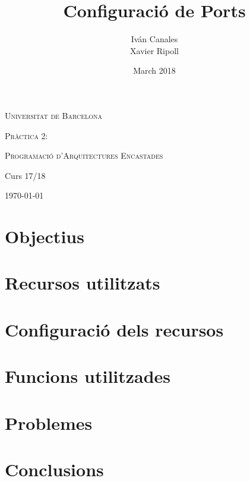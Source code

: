 \documentclass[12pt,a4paper]{article}
\title{Configuració de Ports}
\author{
    Iván Canales%
    \\ 
    Xavier Ripoll%
}
\date{March 2018}
\begin{document}

\begin{titlepage}
	\centering
	{\scshape\LARGE Universitat de Barcelona \par}
	\vspace{2cm}
	{\scshape\Large Pràctica 2:\par} 
	\vspace{1cm}
	{\huge\bfseries \thetitle \par}

    \vfill
    \large\theauthor
	\vfill
	\raggedleft
    
    \par
    
    {\scshape Programació d'Arquitectures Encastades\par}
    \texttt{}{Curs 17/18\par} %
    \today

	
\end{titlepage} \pagebreak

\section{Objectius}

\section{Recursos utilitzats}

\section{Configuració dels recursos}

\section{Funcions utilitzades}

\section{Problemes}

\section{Conclusions}
\end{document}
